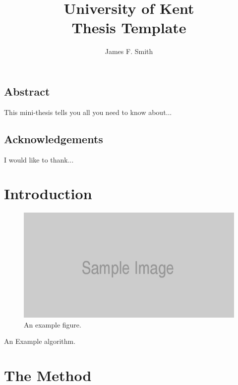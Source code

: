 \normalsize
\title{University of Kent\\Thesis Template} 
\author{James F. Smith} 
\subject{computer science} 

\begin{preface}
\section{Abstract}
This mini-thesis tells you all you need to know about...
\section{Acknowledgements}
I would like to thank...
\end{preface}

\chapter{Introduction}

\lipsum[1]

\begin{figure}
\centering
\includegraphics{sample}
\caption{An example figure.}
\end{figure}

\begin{algorithm}
	\SetAlgoLined
	\DontPrintSemicolon	
	 \;
	
	\caption{An Example algorithm.}
\end{algorithm}

\lipsum[2-5]

\chapter{The Method}

